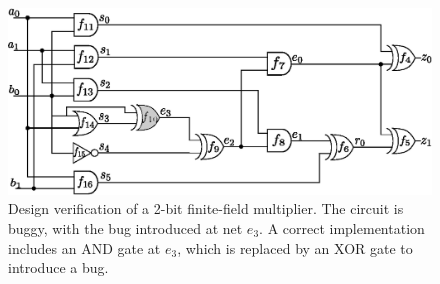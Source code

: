 

\vspace{2ex}

\begin{figure}[hbt]
    \begin{center}
    \includegraphics[scale = 0.5]{mas_red_bug.eps}
    \end{center}
    \caption{\small Design verification of a 2-bit finite-field
      multiplier. The circuit is buggy, with the bug introduced at
    net $e_3$. A correct implementation includes an AND gate at $e_3$,
    which is replaced by an XOR gate to introduce a bug.}
    \label{fig:mas_both}
\end{figure}

